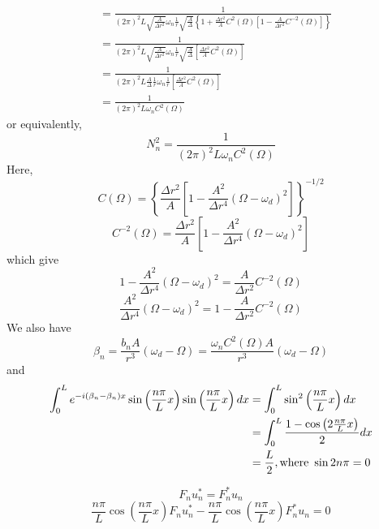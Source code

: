 \documentclass[english]{article}
\begin{document}
\begin{align*}
 & =\frac{1}{\left(2\pi\right)^{2}L\sqrt{\frac{A}{\Delta r^{2}}}\omega_{n}\frac{1}{r}\sqrt{\frac{A}{\Delta}}\left\{ 1+\frac{\Delta r^{2}}{A}C^{2}\left(\Omega\right)\left[1-\frac{A}{\Delta r^{2}}C^{-2}\left(\Omega\right)\right]\right\} }\\
 & =\frac{1}{\left(2\pi\right)^{2}L\sqrt{\frac{A}{\Delta r^{2}}}\omega_{n}\frac{1}{r}\sqrt{\frac{A}{\Delta}}\left[\frac{\Delta r^{2}}{A}C^{2}\left(\Omega\right)\right]}\\
 & =\frac{1}{\left(2\pi\right)^{2}L\frac{A}{\Delta}\frac{1}{r}\omega_{n}\frac{1}{r}\left[\frac{\Delta r^{2}}{A}C^{2}\left(\Omega\right)\right]}\\
 & =\frac{1}{\left(2\pi\right)^{2}L\omega_{n}C^{2}\left(\Omega\right)}
\end{align*}
 or equivalently, 
\[
N^{2}_{n}=\frac{1}{\left(2\pi\right)^{2}L\omega_{n}C^{2}\left(\Omega\right)}
\]
 Here, 
\[
C\left(\Omega\right)=\left\{ \frac{\Delta r^{2}}{A}\left[1-\frac{A^{2}}{\Delta r^{4}}\left(\Omega-\omega_{d}\right)^{2}\right]\right\} ^{-1/2}
\]
 {}
\[
C^{-2}\left(\Omega\right)=\frac{\Delta r^{2}}{A}\left[1-\frac{A^{2}}{\Delta r^{4}}\left(\Omega-\omega_{d}\right)^{2}\right]
\]
 which give 
\[
1-\frac{A^{2}}{\Delta r^{4}}\left(\Omega-\omega_{d}\right)^{2}=\frac{A}{\Delta r^{2}}C^{-2}\left(\Omega\right)
\]
 {}
\[
\frac{A^{2}}{\Delta r^{4}}\left(\Omega-\omega_{d}\right)^{2}=1-\frac{A}{\Delta r^{2}}C^{-2}\left(\Omega\right)
\]
 We also have 
\[
\beta_{n}=\frac{b_{n}A}{r^{3}}\left(\omega_{d}-\Omega\right)=\frac{\omega_{n}C^{2}\left(\Omega\right)A}{r^{3}}\left(\omega_{d}-\Omega\right)
\]
 and 
\begin{align*}
\int^{L}_{0}e^{-i\left(\beta_{n}-\beta_{n}\right)x}\sin\left(\frac{n\pi}{L}x\right)\sin\left(\frac{n\pi}{L}x\right)dx & =\int^{L}_{0}\sin^{2}\left(\frac{n\pi}{L}x\right)dx\\
 & =\int^{L}_{0}\frac{1-\cos\left(2\frac{n\pi}{L}x\right)}{2}dx\\
 & =\frac{L}{2}\hfill,\text{where }\sin2n\pi=0
\end{align*}

\[
F_{n}u^{*}_{n}=F^{*}_{n}u_{n}
\]
\[
\frac{n\pi}{L}\cos\left(\frac{n\pi}{L}x\right)F_{n}u^{*}_{n}-\frac{n\pi}{L}\cos\left(\frac{n\pi}{L}x\right)F^{*}_{n}u_{n}=0
\]
\end{document}
